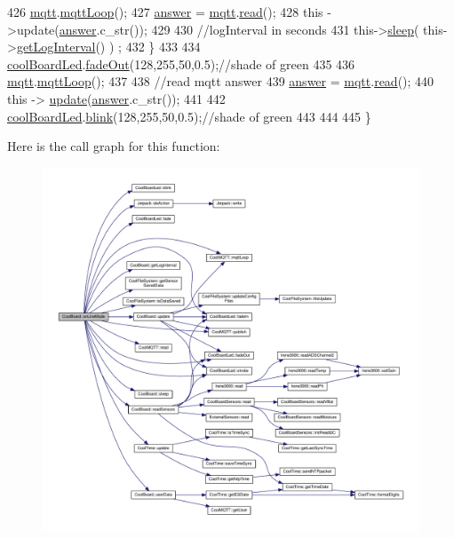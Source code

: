 \begin{DoxyCode}
426         \hyperlink{classCoolBoard_a2399f44d7c23c1149a335cb3b46d90f1}{mqtt}.\hyperlink{classCoolMQTT_aa5eaae967b562b62cbcf2b8d81f6e5d5}{mqttLoop}();
427         \hyperlink{classCoolBoard_a7b835fafd449e5282f7f91d787a2dc15}{answer} = \hyperlink{classCoolBoard_a2399f44d7c23c1149a335cb3b46d90f1}{mqtt}.\hyperlink{classCoolMQTT_ae3c18f6ae9723746d32765f1c8f176ca}{read}();
428         \textcolor{keyword}{this} ->update(\hyperlink{classCoolBoard_a7b835fafd449e5282f7f91d787a2dc15}{answer}.c\_str());
429 
430         \textcolor{comment}{//logInterval in seconds}
431         this->\hyperlink{classCoolBoard_a069952cdcb2e7f68518aa429eceadb6e}{sleep}( this->\hyperlink{classCoolBoard_a7508e029f2ee17bb747ffab599285e0d}{getLogInterval}() ) ;
432     \}
433 
434     \hyperlink{classCoolBoard_a1b1d3c684a5baa56b08486e192fd8e97}{coolBoardLed}.\hyperlink{classCoolBoardLed_a93d545679237e8cc858324367149775c}{fadeOut}(128,255,50,0.5);\textcolor{comment}{//shade of green        }
435 
436     \hyperlink{classCoolBoard_a2399f44d7c23c1149a335cb3b46d90f1}{mqtt}.\hyperlink{classCoolMQTT_aa5eaae967b562b62cbcf2b8d81f6e5d5}{mqttLoop}();
437 
438     \textcolor{comment}{//read mqtt answer}
439     \hyperlink{classCoolBoard_a7b835fafd449e5282f7f91d787a2dc15}{answer} = \hyperlink{classCoolBoard_a2399f44d7c23c1149a335cb3b46d90f1}{mqtt}.\hyperlink{classCoolMQTT_ae3c18f6ae9723746d32765f1c8f176ca}{read}();
440     \textcolor{keyword}{this} -> \hyperlink{classCoolBoard_a8612756d3f73198cdde857a66f0fe690}{update}(\hyperlink{classCoolBoard_a7b835fafd449e5282f7f91d787a2dc15}{answer}.c\_str()); 
441 
442     \hyperlink{classCoolBoard_a1b1d3c684a5baa56b08486e192fd8e97}{coolBoardLed}.\hyperlink{classCoolBoardLed_a96e1ea13003eee34c9dbcef340404426}{blink}(128,255,50,0.5);\textcolor{comment}{//shade of green    }
443 
444 
445 \}
\end{DoxyCode}
Here is the call graph for this function\+:
\nopagebreak
\begin{figure}[H]
\begin{center}
\leavevmode
\includegraphics[width=350pt]{classCoolBoard_aa0bbc4bc605e35618d18e68795c61363_cgraph}
\end{center}
\end{figure}
